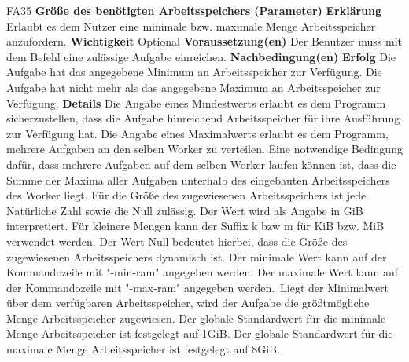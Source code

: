 \documentclass[a4paper,12pt]{article}
\begin{document}
\begin{itemize}[nosep]
\begin{minipage}[t]{\linewidth}
\item[FA35] \textbf{Größe des benötigten Arbeitsspeichers (Parameter)}
\subitem \textbf{Erklärung} Erlaubt es dem Nutzer eine minimale bzw. maximale Menge Arbeitsspeicher anzufordern.
\subitem \textbf{Wichtigkeit} Optional
\subitem \textbf{Voraussetzung(en)} Der Benutzer muss mit dem Befehl eine zulässige Aufgabe einreichen.
\subitem \textbf{Nachbedingung(en)}
\subsubitem \textbf{Erfolg} Die Aufgabe hat das angegebene Minimum an Arbeitsspeicher zur Verfügung.\newline
Die Aufgabe hat nicht mehr als das angegebene Maximum an Arbeitsspeicher zur Verfügung.
\subitem \textbf{Details} Die Angabe eines Mindestwerts erlaubt es dem Programm sicherzustellen, dass die Aufgabe hinreichend Arbeitsspeicher für ihre Ausführung zur Verfügung hat.\newline
Die Angabe eines Maximalwerts erlaubt es dem Programm, mehrere Aufgaben an den selben \gls{Worker} zu verteilen. Eine notwendige Bedingung dafür, dass mehrere Aufgaben auf dem selben \gls{Worker} laufen können ist, dass die Summe der Maxima aller Aufgaben unterhalb des eingebauten Arbeitsspeichers des \gls{Worker} liegt.\newline
Für die Größe des zugewiesenen Arbeitsspeichers ist jede Natürliche Zahl sowie die Null zulässig. Der Wert wird als Angabe in GiB interpretiert. Für kleinere Mengen kann der Suffix k bzw m für KiB bzw. MiB verwendet werden.\newline
Der Wert Null bedeutet hierbei, dass die Größe des zugewiesenen Arbeitsspeichers dynamisch ist.\newline
Der minimale Wert kann auf der Kommandozeile mit "-min-ram" angegeben werden.\newline
Der maximale Wert kann auf der Kommandozeile mit "-max-ram" angegeben werden.\
Liegt der Minimalwert über dem verfügbaren Arbeitsspeicher, wird der Aufgabe die größtmögliche Menge Arbeitsspeicher zugewiesen.\newline
Der globale Standardwert für die minimale Menge Arbeitsspeicher ist festgelegt auf 1GiB.\newline
Der globale Standardwert für die maximale Menge Arbeitsspeicher ist festgelegt auf 8GiB.
\end{minipage}


\end{itemize}
\end{document}

